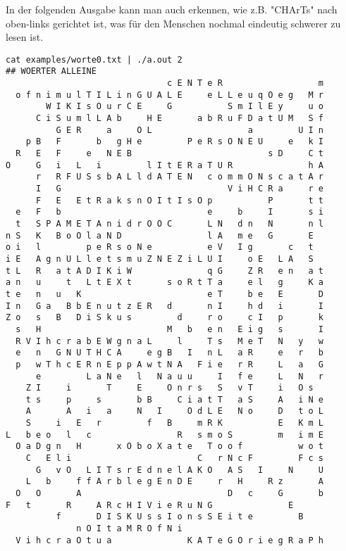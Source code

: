 \documentclass[a4paper,10pt,ngerman]{scrartcl}
\begin{document}
In der folgenden Ausgabe kann man auch erkennen, wie z.B. "CHArTs" nach oben-links gerichtet ist, was für den Menschen nochmal eindeutig schwerer zu lesen ist.	
\begin{lstlisting}
cat examples/worte0.txt | ./a.out 2
## WOERTER ALLEINE
                                c E N T e R                   m
  o f n i m u l T I L i n G U A L E     e L L e u q O e g   M r
        W I K I s O u r C E     G           S m I l E y     u o
      C i S u m l L A b     H E       a b R u F D a t U M   S f
          G E R     a     O L                   a         U I n
    p B   F       b   g H e         P e R s O N E U     e   k I
  R   E   F     e   N E B                           s D     C t
O     G   i   L   i         l I t E R a T U R               h A
      r   R F U S s b A L l d A T E N   c o m m O N s c a t A r
      I   G                                 V i H C R a     r e
      F   E   E t R a k s n O I t I s O p           P       t t
  e   F   b                             e     b     I       s i
  t   S P A M E T A n i d r O O C       L N   d n   N       n l
n S   K   B o O l a N D                 l A   m e   G       E  
o i   l         p e R s o N e           e V   I g       c   t  
i E   A g n U L l e t s m u Z N E Z i L U I     o E   L A   S  
t L   R   a t A D I K i W               q G     Z R   e n   a t
a n   u     t   L t E X t       s o R t T a     e l   g     K a
t e   n   u   K                         e T     b e   E       D
I n   G a   B b E n u t z E R   d       n I     h d   i       I
Z o   s   B   D i S k u s         d     r o     c I   p       k
  s   H                         M   b   e n   E i g   s       I
  R V I h c r a b E W g n a L     l     T s   M e T   N   y   w
  e   n   G N U T H C A     e g B   I   n L   a R     e   r   b
  p   w T h c E R n E p p A w t N A   F i e   r R     L   a   G
      e         L a N e   l   N a u u     I   f e     L   N   r
    Z I     i       T     E     O n r s   S   v T     i   O s  
    t s     p     s       b B     C i a t T   a S     A   i N e
    A       A   i   a     N   I     O d L E   N o     D   t o L
    S     i   E   r         f   B     m R K           E   K m L
L   b e o   l   c                 R   s m o S         m   i m E
  O a D g n   H       x O b o X a t e   T o o f           w o t
    C   E l i                         C   r N c F         F c s
      G   v O   L I T s r E d n e l A K O   A S   I     N     U
    L   b     f f A r b l e g E n D E     r   H     R z       A
  O   O       A                             D   c     G       b
F   t       R     A R c H I V i e R u N G               E      
          f       D I S K U s s I o n s S E i t e         B    
              n O I t a M R O f N i                            
  V i h c r a O t u a               K A T e G O r i e g R a P h
  

\end{lstlisting}
\end{document}
